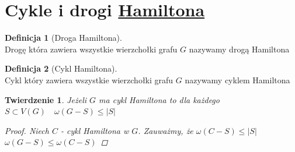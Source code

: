 \documentclass[12pt,a4paper]{article}
\newtheorem{tw}{Twierdzenie}
\theoremstyle{definition}
\newtheorem{df}{Definicja}
\begin{document}
\section{Cykle i drogi \href{http://pl.wikipedia.org/wiki/William_Rowan_Hamilton}{Hamiltona}}

\begin{df}[Droga Hamiltona]~\\
Drogę która zawiera wszystkie wierzchołki grafu $G$ nazywamy drogą Hamiltona
\end{df}

\begin{df}[Cykl Hamiltona]~\\
Cykl który zawiera wszystkie wierzchołki grafu $G$ nazywamy cyklem Hamiltona
\end{df}



\begin{tw}
Jeżeli $G$ ma cykl Hamiltona to dla każdego $S\subset V(G) \quad \omega(G-S) \leqslant |S|$
\begin{proof}
Niech $C$ - cykl Hamiltona w $G$. Zauważmy, że $\omega(C-S) \leqslant |S|$ \\
$\omega(G-S) \leqslant \omega(C-S)$
\end{proof}
\end{tw}
\end{document}
